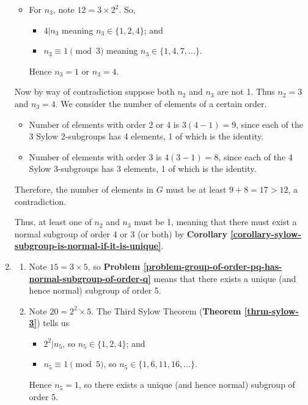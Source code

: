 \begin{enumerate}
\begin{itemize}
        \item For $n_3$, note $12 = 3 \times 2^2$. So,
        \begin{itemize}
            \item $4 \vert n_3$ meaning $n_3 \in \{1, 2, 4\}$; and
            \item $n_3 \equiv 1 \pmod 3$ meaning $n_3 \in \{1, 4, 7, \dots\}$.
        \end{itemize}
        Hence $n_3 = 1$ or $n_3 = 4$.
    \end{itemize}

    Now by way of contradiction suppose both $n_2$ and $n_3$ are not 1. Thus $n_2 = 3$ and $n_3 = 4$. We consider the number of elements of a certain order.
    \begin{itemize}
        \item Number of elements with order 2 or 4 is $3(4-1) = 9$, since each of the 3 Sylow 2-subgroups has 4 elements, 1 of which is the identity.
        \item Number of elements with order 3 is $4(3-1) = 8$, since each of the 4 Sylow 3-subgroups has 3 elements, 1 of which is the identity.
    \end{itemize}
    Therefore, the number of elements in $G$ must be at least $9 + 8 = 17 > 12$, a contradiction.

    Thus, at least one of $n_2$ and $n_3$ must be 1, meaning that there must exist a normal subgroup of order 4 or 3 (or both) by \textbf{Corollary \ref{corollary-sylow-subgroup-is-normal-if-it-is-unique}}.

    \item \begin{enumerate}[label=(\alph*)]
        \item Note $15 = 3 \times 5$, so \textbf{Problem \ref{problem-group-of-order-pq-has-normal-subgroup-of-order-q}} means that there exists a unique (and hence normal) subgroup of order 5.
        \item Note $20 = 2^2 \times 5$. The Third Sylow Theorem (\textbf{Theorem \ref{thrm-sylow-3}}) tells us
        \begin{itemize}
            \item $2^2 \vert n_5$, so $n_5 \in \{1, 2, 4\}$; and
            \item $n_5 \equiv 1 \pmod 5$, so $n_5 \in \{1, 6, 11, 16, \dots\}$.
        \end{itemize}
        Hence $n_5 = 1$, so there exists a unique (and hence normal) subgroup of order 5.
    \end{enumerate}
\end{enumerate}

